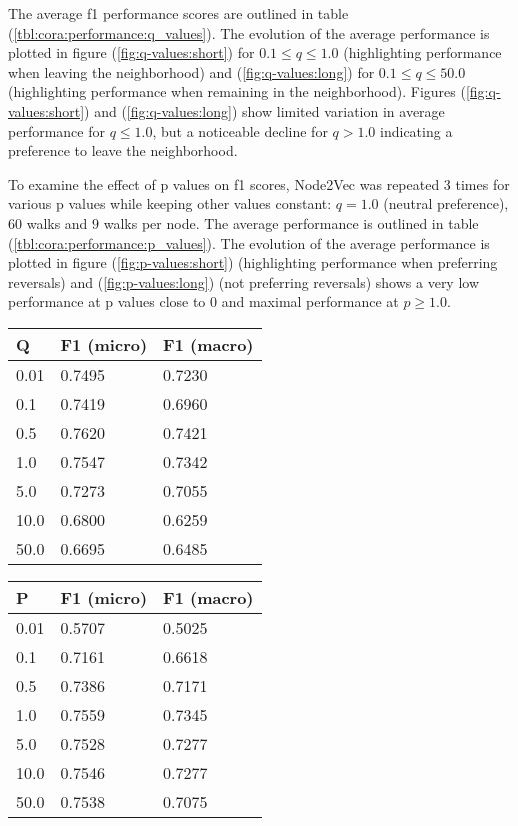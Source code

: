 \documentclass[a4paper,10pt]{article}
\begin{document}
The average f1 performance scores are outlined in table (\ref{tbl:cora:performance:q_values}). The evolution of the average performance is plotted in figure (\ref{fig:q-values:short}) for $0.1 \le q \le 1.0$ (highlighting performance when leaving the neighborhood) and (\ref{fig:q-values:long}) for $0.1 \le q \le 50.0$ (highlighting performance when remaining in the neighborhood). Figures (\ref{fig:q-values:short}) and (\ref{fig:q-values:long}) show limited variation in average performance for $q \le 1.0$, but a noticeable decline for $q > 1.0$ indicating a preference to leave the neighborhood.

To examine the effect of p values on f1 scores, Node2Vec was repeated 3 times for various p values while keeping other values constant: $q = 1.0$ (neutral preference), $60$ walks and $9$ walks per node. The average performance is outlined in table (\ref{tbl:cora:performance:p_values}). The evolution of the average performance is plotted in figure (\ref{fig:p-values:short}) (highlighting performance when preferring reversals) and (\ref{fig:p-values:long}) (not preferring reversals) shows a very low performance at p values close to $0$ and maximal performance at $p \ge 1.0$.

\begin{minipage}[c][18em][c]{0.48\textwidth}
  \begin{tabular}{m{4em} m{7em} m{7em}}
    \hline
    Q & F1 (micro)  & F1 (macro) \\ \hline\hline
    0.01	& 0.7495	& 0.7230 \\ \hline
    0.1	& 0.7419	& 0.6960 \\ \hline
    0.5	& 0.7620	& 0.7421 \\ \hline
    1.0	& 0.7547	& 0.7342 \\ \hline
    5.0	& 0.7273	& 0.7055 \\ \hline
    10.0	& 0.6800	& 0.6259 \\ \hline
    50.0	& 0.6695	& 0.6485 \\ \hline
  \end{tabular}
  \label{tbl:cora:performance:q_values}
\end{minipage}
\hfill
\begin{minipage}[c][18em][c]{0.48\textwidth}
  \begin{tabular}{m{4em} m{7em} m{7em}}
    \hline
    P & F1 (micro)  & F1 (macro) \\
    \hline\hline
    0.01	& 0.5707	& 0.5025 \\ \hline
    0.1	& 0.7161	& 0.6618 \\ \hline
    0.5	& 0.7386	& 0.7171 \\ \hline
    1.0	& 0.7559	& 0.7345 \\ \hline
    5.0	& 0.7528	& 0.7277 \\ \hline
    10.0	& 0.7546	& 0.7277 \\ \hline
    50.0	& 0.7538	& 0.7075 \\ \hline
  \end{tabular}
  \label{tbl:cora:performance:p_values}
\end{minipage}
\end{document}
